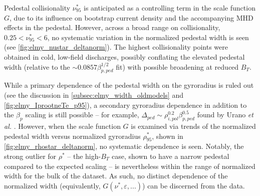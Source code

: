 \begin{figure}[t]
 \pushtooutside
\end{figure}

Pedestal collisionality $\nu^*_{95}$ is anticipated as a controlling term in the scale function $G$, due to its influence on bootstrap current density and the accompanying MHD effects in the pedestal.  However, across a broad range on collisionality, $0.25 < \nu^*_{95} < 6$, no systematic variation in the normalized pedestal width is seen (see \cref{fig:elmy_nustar_deltanorm}).  The highest collisionality points were obtained in cold, low-field discharges, possibly conflating the elevated pedestal width (relative to the $\sim 0.0857 \beta_{p,ped}^{1/2}$ fit) with possible broadening at reduced $B_T$.

While a primary dependence of the pedestal width on the gyroradius is ruled out (see the discussion in \cref{subsec:elmy_width_oldmodels} and \cref{fig:elmy_IprootneTe_p95}), a secondary gyroradius dependence in addition to the $\beta_{p}$ scaling is still possible -- for example, $\Delta_{ped} \sim \rho_{i,pol}^{0.2} \beta_{p,ped}^{0.5}$ found by Urano \emph{et al.} \cite{Urano2008}.  However, when the scale function $G$ is examined via trends of the normalized pedestal width versus normalized gyroradius $\rho^*_{95}$, shown in \cref{fig:elmy_rhostar_deltanorm}, no systematic dependence is seen.  Notably, the strong outlier for $\rho^*$ -- the high-$B_T$ case, shown to have a narrow pedestal compared to the expected scaling -- is nevertheless within the range of normalized width for the bulk of the dataset.  As such, no distinct dependence of the normalized width (equivalently, $G(\nu^*,\varepsilon,...)$) can be discerned from the data.\nicesectionending

